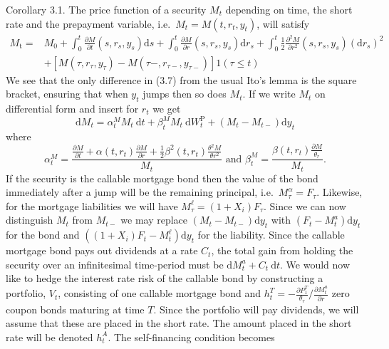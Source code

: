 \documentclass[12pt,twoside]{reedthesis}
\begin{document}
Corollary 3.1. The price function of a security \(M_{t}\) depending on time, the short rate and the prepayment variable, i.e.~\(M_{t}=M\left(t, r_{t}, y_{t}\right)\), will satisfy
\[
\begin{aligned}
M_{\mathrm{t}}=& M_{0}+\int_{0}^{t} \frac{\partial M}{\partial t}\left(s, r_{s}, y_{s}\right) \mathrm{d} s+\int_{0}^{t} \frac{\partial M}{\partial r}\left(s, r_{s}, y_{s}\right) \mathrm{d} r_{s}+\int_{0}^{t} \frac{1}{2} \frac{\partial^{2} M}{\partial r^{2}}\left(s, r_{s}, y_{s}\right)\left(\mathrm{d} r_{s}\right)^{2} \\
&+\left[M\left(\tau, r_{\tau}, y_{\tau}\right)-M\left(\tau-, r_{\tau-}, y_{\tau-}\right)\right] 1(\tau \leq t)
\end{aligned}
\]
We see that the only difference in (3.7) from the usual Ito's lemma is the square bracket, ensuring that when \(y_{t}\) jumps then so does \(M_{t}\). If we write \(M_{t}\) on differential form and insert for \(r_{t}\) we get
\[
\mathrm{d} M_{t}=\alpha_{t}^{M} M_{t} \mathrm{~d} t+\beta_{t}^{M} M_{t} \mathrm{~d} W_{t}^{\mathrm{P}}+\left(M_{t}-M_{t-}\right) \mathrm{d} y_{t}
\]
where
\[
\alpha_{t}^{M}=\frac{\frac{\partial M}{\partial t}+\alpha\left(t, r_{t}\right) \frac{\partial M}{\partial r}+\frac{1}{2} \beta^{2}\left(t, r_{t}\right) \frac{\theta^{2} M}{\theta r^{2}}}{M_{t}} \text { and } \beta_{t}^{M}=\frac{\beta\left(t, r_{t}\right) \frac{\partial M}{\theta_{r}}}{M_{t}} .
\]
If the security is the callable mortgage bond then the value of the bond immediately after a jump will be the remaining principal, i.e.~\(M_{\tau}^{\alpha}=F_{\tau}\). Likewise, for the mortgage liabilities we will have \(M_{\tau}^{\ell}=\left(1+X_{i}\right) F_{\tau}\). Since we can now distinguish \(M_{t}\) from \(M_{t-}\) we may replace \(\left(M_{t}-M_{t-}\right) \mathrm{d} y_{t}\) with \(\left(F_{t}-M_{t}^{a}\right) \mathrm{d} y_{t}\) for the bond and \(\left(\left(1+X_{i}\right) F_{t}-M_{t}^{\ell}\right) \mathrm{d} y_{t}\) for the liability. Since the callable mortgage bond pays out dividends at a rate \(C_{t}\), the total gain from holding the security over an infinitesimal time-period must be \(\mathrm{d} M_{t}^{a}+C_{t} \mathrm{~d} t\). We would now like to hedge the interest rate risk of the callable bond by constructing a portfolio, \(V_{t}\), consisting of one callable mortgage bond and \(h_{t}^{T}=-\frac{\partial P_{1}^{T}}{\theta_{r}} / \frac{\partial M_{t}^{a}}{\partial r}\) zero coupon bonds maturing at time \(T\). Since the portfolio will pay dividends, we will assume that these are placed in the short rate. The amount placed in the short rate will be denoted \(h_{t}^{A}\). The self-financing condition becomes
\end{document}
